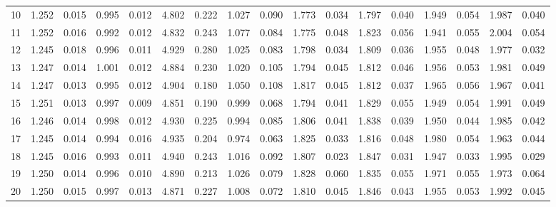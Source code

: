 \documentclass{article}
\begin{document}
\begin{table}[H]
{\begin{tabular}{|c|c|c|c|c|c|c|c|c|c|c|c|c|c|c|c|c|}
    10 & 1.252 & 0.015 & 0.995 & 0.012 & 4.802 & 0.222 & 1.027 & 0.090 & 1.773 & 0.034 & 1.797 & 0.040 & 1.949 & 0.054 & 1.987 & 0.040 \\ 
    11 & 1.252 & 0.016 & 0.992 & 0.012 & 4.832 & 0.243 & 1.077 & 0.084 & 1.775 & 0.048 & 1.823 & 0.056 & 1.941 & 0.055 & 2.004 & 0.054 \\ 
    12 & 1.245 & 0.018 & 0.996 & 0.011 & 4.929 & 0.280 & 1.025 & 0.083 & 1.798 & 0.034 & 1.809 & 0.036 & 1.955 & 0.048 & 1.977 & 0.032 \\ 
    13 & 1.247 & 0.014 & 1.001 & 0.012 & 4.884 & 0.230 & 1.020 & 0.105 & 1.794 & 0.045 & 1.812 & 0.046 & 1.956 & 0.053 & 1.981 & 0.049 \\ 
    14 & 1.247 & 0.013 & 0.995 & 0.012 & 4.904 & 0.180 & 1.050 & 0.108 & 1.817 & 0.045 & 1.812 & 0.037 & 1.965 & 0.056 & 1.967 & 0.041 \\ 
    15 & 1.251 & 0.013 & 0.997 & 0.009 & 4.851 & 0.190 & 0.999 & 0.068 & 1.794 & 0.041 & 1.829 & 0.055 & 1.949 & 0.054 & 1.991 & 0.049 \\ 
    16 & 1.246 & 0.014 & 0.998 & 0.012 & 4.930 & 0.225 & 0.994 & 0.085 & 1.806 & 0.041 & 1.838 & 0.039 & 1.950 & 0.044 & 1.985 & 0.042 \\ 
    17 & 1.245 & 0.014 & 0.994 & 0.016 & 4.935 & 0.204 & 0.974 & 0.063 & 1.825 & 0.033 & 1.816 & 0.048 & 1.980 & 0.054 & 1.963 & 0.044 \\ 
    18 & 1.245 & 0.016 & 0.993 & 0.011 & 4.940 & 0.243 & 1.016 & 0.092 & 1.807 & 0.023 & 1.847 & 0.031 & 1.947 & 0.033 & 1.995 & 0.029 \\ 
    19 & 1.250 & 0.014 & 0.996 & 0.010 & 4.890 & 0.213 & 1.026 & 0.079 & 1.828 & 0.060 & 1.835 & 0.055 & 1.971 & 0.055 & 1.973 & 0.064 \\ 
    20 & 1.250 & 0.015 & 0.997 & 0.013 & 4.871 & 0.227 & 1.008 & 0.072 & 1.810 & 0.045 & 1.846 & 0.043 & 1.955 & 0.053 & 1.992 & 0.045 \\ 
 \hline
 

\end{tabular}}
\end{table}
\end{document}
